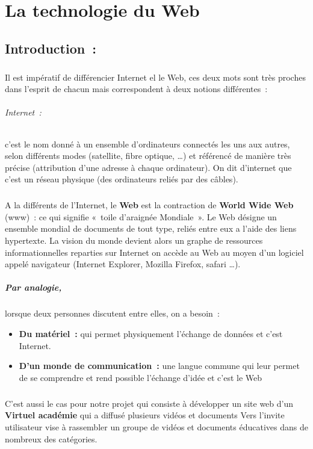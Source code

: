 \chapter{La technologie du Web}
\minitoc

\section{Introduction :}
\paragraph{}
Il est impératif de différencier Internet el le Web, ces deux mots sont très proches dans l’esprit de chacun mais correspondent à deux notions différentes :
\subparagraph{Internet :}
c’est le nom donné à un ensemble d’ordinateurs connectés les uns aux autres, selon différents modes (satellite, fibre optique, …) et référencé de manière très précise (attribution d’une adresse à chaque ordinateur). On dit d’internet que c’est un réseau physique (des ordinateurs reliés par des câbles).
\paragraph{}
A la différents de l’Internet, le \textbf{Web} est la contraction de \textbf{World Wide Web} (www) : ce qui signifie « toile d’araignée Mondiale ». Le Web désigne un ensemble mondial de documents de tout type, reliés entre eux a l’aide des liens hypertexte. La vision du monde devient alors un graphe de ressources informationnelles reparties sur Internet on accède au Web au moyen d’un logiciel appelé navigateur (Internet Explorer, Mozilla Firefox, safari …).
\paragraph{Par analogie,}
 lorsque deux personnes discutent entre elles, on a besoin :
 
 \begin{itemize}
 	\item \textbf{Du matériel :} qui permet physiquement l’échange de données et c’est Internet.
 	\item \textbf{D’un monde de communication :} une langue commune qui leur permet de se comprendre et rend possible l’échange d’idée et c’est le Web
 \end{itemize}
 \paragraph{}
 C’est aussi le cas pour notre projet qui consiste à développer un site web d’un \textbf{Virtuel académie} qui a diffusé plusieurs vidéos et documents Vers l'invite utilisateur vise à rassembler un groupe de vidéos et documents éducatives dans de nombreux des catégories.
 
